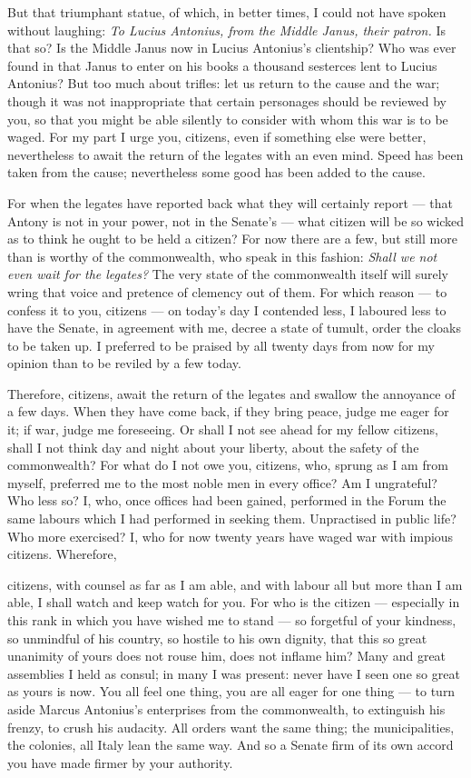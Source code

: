  But that triumphant statue, of which, in better times, I could not have spoken without laughing: \textit{To Lucius Antonius, from the Middle Janus, their patron.} Is that so? Is the Middle Janus now in Lucius Antonius's clientship? Who was ever found in that Janus to enter on his books a thousand sesterces lent to Lucius Antonius? But too much about trifles: let us return to the cause and the war; though it was not inappropriate that certain personages should be reviewed by you, so that you might be able silently to consider with whom this war is to be waged. For my part I urge you, citizens, even if something else were better, nevertheless to await the return of the legates with an even mind. Speed has been taken from the cause; nevertheless some good has been added to the cause.

 For when the legates have reported back what they will certainly report --- that Antony is not in your power, not in the Senate's --- what citizen will be so wicked as to think he ought to be held a citizen? For now there are a few, but still more than is worthy of the commonwealth, who speak in this fashion: \textit{Shall we not even wait for the legates?} The very state of the commonwealth itself will surely wring that voice and pretence of clemency out of them. For which reason --- to confess it to you, citizens --- on today's day I contended less, I laboured less to have the Senate, in agreement with me, decree a state of tumult, order the cloaks to be taken up. I preferred to be praised by all twenty days from now for my opinion than to be reviled by a few today.

 Therefore, citizens, await the return of the legates and swallow the annoyance of a few days. When they have come back, if they bring peace, judge me eager for it; if war, judge me foreseeing. Or shall I not see ahead for my fellow citizens, shall I not think day and night about your liberty, about the safety of the commonwealth? For what do I not owe you, citizens, who, sprung as I am from myself, preferred me to the most noble men in every office? Am I ungrateful? Who less so? I, who, once offices had been gained, performed in the Forum the same labours which I had performed in seeking them. Unpractised in public life? Who more exercised? I, who for now twenty years have waged war with impious citizens. Wherefore,

 citizens, with counsel as far as I am able, and with labour all but more than I am able, I shall watch and keep watch for you. For who is the citizen --- especially in this rank in which you have wished me to stand --- so forgetful of your kindness, so unmindful of his country, so hostile to his own dignity, that this so great unanimity of yours does not rouse him, does not inflame him? Many and great assemblies I held as consul; in many I was present: never have I seen one so great as yours is now. You all feel one thing, you are all eager for one thing --- to turn aside Marcus Antonius's enterprises from the commonwealth, to extinguish his frenzy, to crush his audacity. All orders want the same thing; the municipalities, the colonies, all Italy lean the same way. And so a Senate firm of its own accord you have made firmer by your authority.

